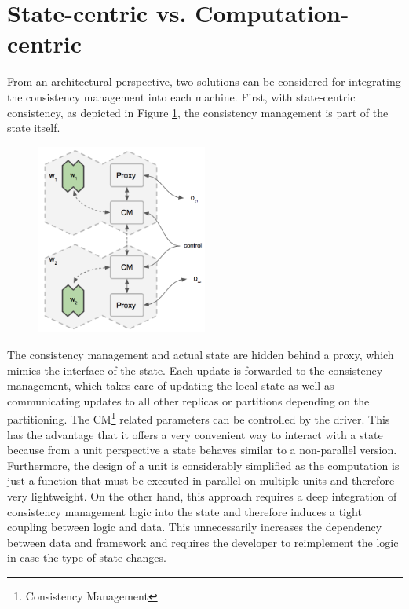\section{State-centric vs. Computation-centric}
From an architectural perspective, two solutions can be considered for integrating the consistency management into each machine.
First, with state-centric consistency, as depicted in Figure \ref{fig:state_centric_consistency}, the consistency management is part of the state itself.
\begin{figure}[ht]
\centering
\includegraphics[width=0.5\textwidth]{img/state_centric_consist.png}
\caption{}
\label{fig:state_centric_consistency}
\end{figure}
The consistency management and actual state are hidden behind a proxy, which mimics the interface of the state.
Each update is forwarded to the consistency management, which takes care of updating the local state as well as communicating updates to all other replicas or partitions depending on the partitioning.
The CM\footnote{Consistency Management} related parameters can be controlled by the driver.
This has the advantage that it offers a very convenient way to interact with a state because from a unit perspective a state behaves similar to a non-parallel version.
Furthermore, the design of a unit is considerably simplified as the computation is just a function that must be executed in parallel on multiple units and therefore very lightweight.
On the other hand, this approach requires a deep integration of consistency management logic into the state and therefore induces a tight coupling between logic and data.
This unnecessarily increases the dependency between data and framework and requires the developer to reimplement the logic in case the type of state changes.

